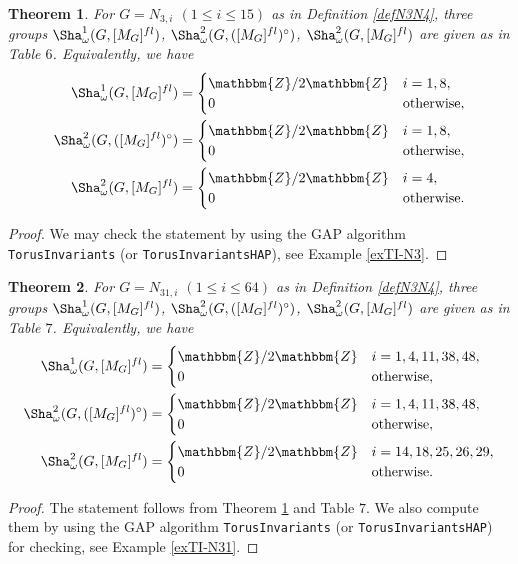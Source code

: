\documentclass{amsart}
\theoremstyle{plain}
\newtheorem{theorem}{Theorem}[section]
\theoremstyle{definition}
\theoremstyle{remark}
\newcommand{\bZ}{\mathbbm{Z}}\newcommand{\bQ}{\mathbbm{Q}}
\begin{document}
\begin{theorem}\label{th4.4}
For $G=N_{3,i}$ $(1\leq i\leq 15)$ as in Definition \ref{defN3N4}, 
three groups $\Sha^1_\omega(G,[M_G]^{fl})$, 
$\Sha^2_\omega(G,([M_G]^{fl})^\circ)$, 
$\Sha^2_\omega(G,[M_G]^{fl})$ 
are given as in {\rm Table} $6$. 
Equivalently, we have 
\begin{align*}
\Sha^1_\omega(G,[M_G]^{fl})&=
\begin{cases}
\bZ/2\bZ& i=1,8,\\
0& {\rm otherwise},
\end{cases}\\
\Sha^2_\omega(G,([M_G]^{fl})^\circ)&=
\begin{cases}
\bZ/2\bZ& i=1,8,\\
0& {\rm otherwise},
\end{cases}\\
\Sha^2_\omega(G,[M_G]^{fl})&=
\begin{cases}
\bZ/2\bZ& i=4,\\
0& {\rm otherwise}.
\end{cases}
\end{align*}
\end{theorem}
\begin{proof}
We may check the statement 
by using the GAP algorithm 
{\tt TorusInvariants} (or {\tt TorusInvariantsHAP}), 
see Example \ref{exTI-N3}. 
\end{proof}

\begin{theorem}\label{th4.5}
For $G=N_{31,i}$ $(1\leq i\leq 64)$ as in Definition \ref{defN3N4}, 
three groups $\Sha^1_\omega(G,[M_G]^{fl})$, 
$\Sha^2_\omega(G,([M_G]^{fl})^\circ)$, 
$\Sha^2_\omega(G,[M_G]^{fl})$ 
are given as in {\rm Table} $7$. 
Equivalently, we have 
\begin{align*}
\Sha^1_\omega(G,[M_G]^{fl})&=
\begin{cases}
\bZ/2\bZ& i=1,4,11,38,48,\\
0&{\rm otherwise},
\end{cases}\\
\Sha^2_\omega(G,([M_G]^{fl})^\circ)&=
\begin{cases}
\bZ/2\bZ& i=1,4,11,38,48,\\
0&{\rm otherwise},
\end{cases}\\
\Sha^2_\omega(G,[M_G]^{fl})&=
\begin{cases}
\bZ/2\bZ& i=14,18,25,26,29,\\
0&{\rm otherwise}.
\end{cases}
\end{align*}
\end{theorem}
\begin{proof}
The statement follows from Theorem \ref{th4.4} and Table $7$. 
We also compute them by using the GAP algorithm 
{\tt TorusInvariants} (or {\tt TorusInvariantsHAP}) for checking, 
see Example \ref{exTI-N31}. 
\end{proof}
\end{document}
